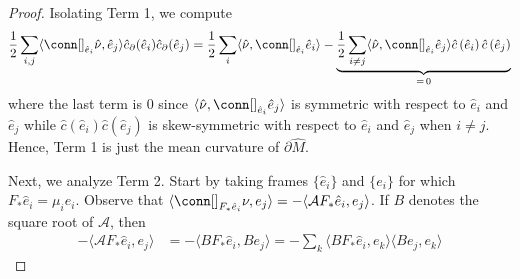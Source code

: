 \documentclass[12pt, reqno]{amsart}
\theoremstyle{plain} %
\theoremstyle{definition}
\theoremstyle{remark}
\numberwithin{equation}{section}
\newcommand{\dom}[1]{\hat{#1}}
\newcommand{\bnd}[1]{\partial #1}
\newcommand{\cbar}[1]{\dom{c}\left(#1\right)}
\newcommand{\inner}[1]{\langle #1 \rangle}
\begin{document}
\begin{proof}
    Isolating Term 1, we compute
    \begin{equation*}
        \frac{1}{2} \sum_{i, j} \inner{\conn[]_{\dom{e}_i} \dom{\nu}, \dom{e}_j} \dom{c}_\partial(\dom{e}_i) \dom{c}_\partial(\dom{e}_j) = \frac{1}{2} \sum_i \inner{\dom{\nu}, \conn[]_{\dom{e}_i} \dom{e}_i} - \underbrace{\frac{1}{2} \sum_{i \neq j} \inner{\dom{\nu}, \conn[]_{\dom{e}_i} \dom{e}_j} \cbar{\dom{e}_i} \cbar{\dom{e}_j}}_{=\, 0}
    \end{equation*}
    where the last term is 0 since \(\inner{\dom{\nu}, \conn[]_{\dom{e}_i} \dom{e}_j}\) is symmetric with respect to \(\dom{e}_i\) and \(\dom{e}_j\) while \(\cbar{\dom{e}_i} \cbar{\dom{e}_j}\) is skew-symmetric with respect to \(\dom{e}_i\) and \(\dom{e}_j\) when \(i \neq j\).
    Hence, Term 1 is just the mean curvature of \(\bnd{\dom{M}}\).

    Next, we analyze Term 2.
    Start by taking frames \(\{\dom{e}_i\}\) and \(\{e_i\}\) for which \(F_*\dom{e}_i = \mu_i e_i\).
    Observe that \(\inner{\conn[]_{F_*\dom{e}_i} \nu, e_j} = -\inner{\mathcal{A} F_*\dom{e}_i, e_j}\).
    If \(B\) denotes the square root of \(\mathcal{A}\), then
    \begin{align*}
        -\inner{\mathcal{A} F_*\dom{e}_i, e_j} &= -\inner{B F_*\dom{e}_i, B e_j} = -\sum_k \inner{BF_*\dom{e}_i, e_k} \inner{Be_j, e_k}
    \end{align*}


\end{proof}
\end{document}
